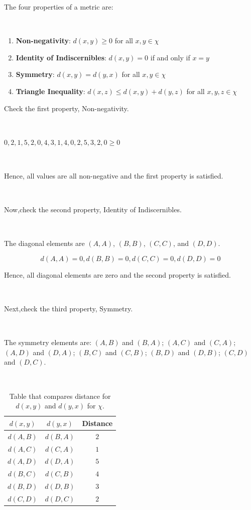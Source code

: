 \documentclass{article}
\begin{document}
\parbox{\textwidth}{The four properties of a metric are:}\\

\begin{enumerate}
    \item \textbf{Non-negativity}: $d(x,y) \geq 0$ for all $x,y \in \chi$
    \item \textbf{Identity of Indiscernibles}: $d(x,y) = 0$ if and only if $x = y$
    \item \textbf{Symmetry}: $d(x,y) = d(y,x)$ for all $x,y \in \chi$
    \item \textbf{Triangle Inequality}: $d(x,z) \leq d(x,y) + d(y,z)$ for all $x,y,z \in \chi$
\end{enumerate}

\parbox{\textwidth}{Check the first property, Non-negativity.}\\

\parbox{\textwidth}{$0,2,1,5,2,0,4,3,1,4,0,2,5,3,2,0 \geq 0$}\\

\parbox{\textwidth}{Hence, all values are all non-negative and the first property is satisfied.}\\

\parbox{\textwidth}{Now,check the second property, Identity of Indiscernibles.}\\

\parbox{\textwidth}{The diagonal elements are $(A,A)$, $(B,B)$, $(C,C)$, and $(D,D)$.}

$$d(A,A) = 0 , d(B,B) = 0 , d(C,C) = 0 , d(D,D) = 0$$

\parbox{\textwidth}{Hence, all diagonal elements are zero and the second property is satisfied.}\\

\parbox{\textwidth}{Next,check the third property, Symmetry.}\\

\parbox{\textwidth}{The symmetry elements are: $(A,B)$ and $(B,A)$; $(A,C)$ and $(C,A)$; $(A,D)$ and $(D,A)$; $(B,C)$ and $(C,B)$; $(B,D)$ and $(D,B)$; $(C,D)$ and $(D,C)$.}\\

\begin{table}[h]
\centering
\begin{tabular}{|c|c|c|}
\hline
$d(x,y)$ & $d(y,x)$ & Distance \\
\hline
$d(A,B)$ & $d(B,A)$  & $2$ \\
$d(A,C)$ & $d(C,A)$  & $1$ \\
$d(A,D)$ & $d(D,A)$  & $5$ \\
$d(B,C)$ & $d(C,B)$  & $4$ \\
$d(B,D)$ & $d(D,B)$  & $3$ \\
$d(C,D)$ & $d(D,C)$  & $2$ \\
\hline
\end{tabular}
\caption{Table that compares distance for $d(x,y)$ and $d(y,x)$ for $\chi$.}
\label{tab:solution}
\end{table}
\end{document}
